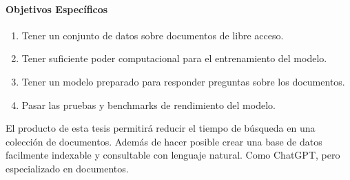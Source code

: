 \documentclass[../main.tex]{subfiles}
\begin{document}
\paragraph{Objetivos Específicos}

\begin{enumerate}
    \item Tener un conjunto de datos sobre documentos de libre acceso.
    \item Tener suficiente poder computacional para el entrenamiento del modelo.
    \item Tener un modelo preparado para responder preguntas sobre los documentos.
    \item Pasar las pruebas y benchmarks de rendimiento del modelo.
\end{enumerate}

%


El producto de esta tesis permitirá reducir el tiempo de búsqueda en una
colección de documentos.
Además de hacer posible crear una base de datos facilmente indexable y consultable con lenguaje natural.
Como ChatGPT\cite{leiter2023chatgpt}, pero especializado en documentos.
\end{document}
